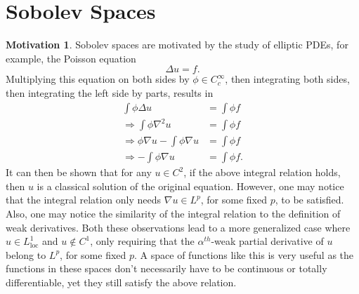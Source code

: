 \documentclass[11pt]{article}
\theoremstyle{definition}
\newtheorem*{motivation}{Motivation}
\begin{document}

\newpage

\section{Sobolev Spaces}
\begin{motivation}
Sobolev spaces are motivated by the study of elliptic PDEs, for example, the Poisson equation
\[\Delta{u} = f.\]
Multiplying this equation on both sides by $\phi \in C_{c}^{\infty}$, then integrating both sides, then integrating the left side by parts, results in
\begin{equation*}
	\begin{aligned}
		\int \phi \Delta u &= \int \phi f \\
		\Rightarrow \int \phi \nabla^2 u &= \int \phi f \\
		\Rightarrow \phi \nabla u - \int \phi \nabla u &= \int \phi f \\ 
		\Rightarrow - \int \phi \nabla u &= \int \phi f.
	\end{aligned}
\end{equation*}
It can then be shown that for any $u \in C^2$, if the above integral relation holds, then $u$ is a classical solution of the original equation.
However, one may notice that the integral relation only needs $\nabla u \in L^p$, for some fixed $p$, to be satisfied.
Also, one may notice the similarity of the integral relation to the definition of weak derivatives. Both these observations lead to a more generalized
case where $u \in L^1_{\text{loc}}$ and $u \not\in C^1$, only requiring that the $\alpha^{th}$-weak partial derivative of $u$ belong to $L^p$, for some fixed $p$.
A space of functions like this is very useful as the functions in these spaces don't necessarily have to be continuous or totally differentiable,
yet they still satisfy the above relation. 
\end{motivation}
\end{document}
